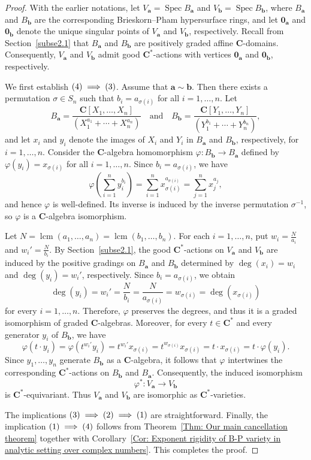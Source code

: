\documentclass[english,10pt,reqno,twoside]{amsart}
\numberwithin{equation}{section}
\numberwithin{figure}{section}
\theoremstyle{plain}
\theoremstyle{plain}
\theoremstyle{definition}
\theoremstyle{plain}
\numberwithin{equation}{section}
\newcommand{\C}{\mathbf{C}}
\newcommand{\oo}{\mathbf{0}}
\newcommand{\ba}{\mathbf{a}}
\newcommand{\bb}{\mathbf{b}}
\newcommand{\Spec}{\operatorname{Spec}}
\begin{document}
\begin{proof}
With the earlier notations, let $V_\ba=\Spec B_\ba$ and $V_\bb=\Spec B_\bb$, where $B_\ba$ and $B_\bb$ are the corresponding Brieskorn--Pham hypersurface rings, and let $\oo_\ba$ and $\oo_\bb$ denote the unique singular points of $V_\ba$ and $V_\bb$, respectively. Recall from Section~\ref{subse2.1} that $B_\ba$ and $B_\bb$ are positively graded affine $\C$-domains. Consequently, $V_\ba$ and $V_\bb$ admit good $\C^*$-actions with vertices $\oo_\ba$ and $\oo_\bb$, respectively.

We first establish $\textup{(4)}\implies\textup{(3)}$. Assume that $\ba\sim\bb$. Then there exists a permutation $\sigma\in S_n$ such that $b_i=a_{\sigma(i)}$ for all $i=1,\ldots,n$. Let
\[
B_\ba=
\frac{\C[X_1,\ldots,X_n]}
{(X_1^{a_1}+\cdots+X_n^{a_n})}
\quad\text{and}\quad
B_\bb=
\frac{\C[Y_1,\ldots,Y_n]}
{(Y_1^{b_1}+\cdots+Y_n^{b_n})},
\]
and let $x_i$ and $y_i$ denote the images of $X_i$ and $Y_i$ in $B_\ba$ and $B_\bb$, respectively, for $i=1,\ldots,n$. Consider the $\C$-algebra homomorphism $\varphi:B_\bb\longrightarrow B_\ba$
defined by $\varphi(y_i)=x_{\sigma(i)}$ for all $i=1,\ldots,n$. Since $b_i=a_{\sigma(i)}$, we have
\[
\varphi\!\left(\sum_{i=1}^{n}y_i^{b_i}\right)
=
\sum_{i=1}^{n}x_{\sigma(i)}^{a_{\sigma(i)}}
=
\sum_{j=1}^{n}x_j^{a_j},
\]
and hence $\varphi$ is well-defined. Its inverse is induced by the inverse permutation $\sigma^{-1}$, so $\varphi$ is a $\C$-algebra isomorphism.

Let $N=\operatorname{lcm}(a_1,\ldots,a_n) =
\operatorname{lcm}(b_1,\ldots,b_n)$. For each $i=1,\ldots,n$, put $w_i=\frac{N}{a_i}$ and $w_i'=\frac{N}{b_i}$. By Section~\ref{subse2.1}, the good $\C^*$-actions on $V_\ba$ and $V_\bb$ are induced by the positive gradings on $B_\ba$ and $B_\bb$ determined by $\deg(x_i)=w_i$ and $\deg(y_i)=w_i'$, respectively. Since $b_i=a_{\sigma(i)}$, we obtain 
\[
\deg(y_i)=w_i'=\frac{N}{b_i}=\frac{N}{a_{\sigma(i)}}=w_{\sigma(i)}=\deg(x_{\sigma(i)})
\]
for every $i=1,\ldots,n$. Therefore, $\varphi$ preserves the degrees, and thus it is a graded isomorphism of graded $\C$-algebras. Moreover, for every $t\in\C^*$ and every generator $y_i$ of $B_\bb$, we have
\[
\varphi(t\cdot y_i)=\varphi(t^{w_i'}y_i)=t^{w_i'}x_{\sigma(i)}=t^{w_{\sigma(i)}}x_{\sigma(i)}=t\cdot x_{\sigma(i)}=t\cdot\varphi(y_i).
\]
Since $y_1,\ldots,y_n$ generate $B_\bb$ as a $\C$-algebra, it follows that $\varphi$ intertwines the corresponding $\C^*$-actions on $B_\bb$ and $B_\ba$. Consequently, the induced isomorphism
\[
\varphi^*:V_\ba\longrightarrow V_\bb
\]
is $\C^*$-equivariant. Thus $V_\ba$ and $V_\bb$ are isomorphic as $\C^*$-varieties.

The implications $\rm(3)\implies\rm(2)\implies\rm(1)$ are straightforward. Finally, the implication $\textup{(1)}\implies\textup{(4)}$ follows from Theorem~\ref{Thm: Our main cancellation theorem} together with Corollary~\ref{Cor: Exponent rigidity of B-P variety in analytic setting over complex numbers}. This completes the proof.
\end{proof}
\end{document}
